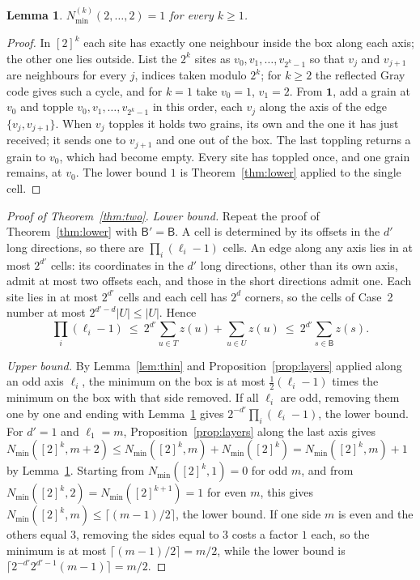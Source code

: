 \documentclass[11pt]{amsart}
\newtheorem{lemma}[theorem]{Lemma}
\theoremstyle{definition}
\newcommand{\one}{\mathbf 1}
\newcommand{\Nmin}{N_{\min}}
\newcommand{\B}{\mathsf B}
\begin{document}
\begin{lemma}\label{lem:cube}
$\Nmin^{(k)}(2,\dots,2)=1$ for every $k\ge1$.
\end{lemma}

\begin{proof}
In $[2]^k$ each site has exactly one neighbour inside the box along each axis; the other one lies outside. List the $2^k$ sites as $v_0,v_1,\dots,v_{2^k-1}$ so that $v_j$ and $v_{j+1}$ are neighbours for every $j$, indices taken modulo $2^k$; for $k\ge2$ the reflected Gray code gives such a cycle, and for $k=1$ take $v_0=1$, $v_1=2$. From $\one$, add a grain at $v_0$ and topple $v_0,v_1,\dots,v_{2^k-1}$ in this order, each $v_j$ along the axis of the edge $\{v_j,v_{j+1}\}$. When $v_j$ topples it holds two grains, its own and the one it has just received; it sends one to $v_{j+1}$ and one out of the box. The last toppling returns a grain to $v_0$, which had become empty. Every site has toppled once, and one grain remains, at $v_0$. The lower bound $1$ is Theorem~\ref{thm:lower} applied to the single cell.
\end{proof}

\begin{proof}[Proof of Theorem~\ref{thm:two}]
\emph{Lower bound.} Repeat the proof of Theorem~\ref{thm:lower} with $\B'=\B$. A cell is determined by its offsets in the $d'$ long directions, so there are $\prod_i(\ell_i-1)$ cells. An edge along any axis lies in at most $2^{d'}$ cells: its coordinates in the $d'$ long directions, other than its own axis, admit at most two offsets each, and those in the short directions admit one. Each site lies in at most $2^{d'}$ cells and each cell has $2^d$ corners, so the cells of Case~2 number at most $2^{d'-d}|U|\le|U|$. Hence
\[
\prod_i(\ell_i-1)\ \le\ 2^{d'}\sum_{u\in T}z(u)+\sum_{u\in U}z(u)\ \le\ 2^{d'}\sum_{s\in\B}z(s).
\]

\emph{Upper bound.} By Lemma~\ref{lem:thin} and Proposition~\ref{prop:layers} applied along an odd axis $\ell_i$, the minimum on the box is at most $\tfrac12(\ell_i-1)$ times the minimum on the box with that side removed. If all $\ell_i$ are odd, removing them one by one and ending with Lemma~\ref{lem:cube} gives $2^{-d'}\prod_i(\ell_i-1)$, the lower bound. For $d'=1$ and $\ell_1=m$, Proposition~\ref{prop:layers} along the last axis gives $\Nmin([2]^k,m+2)\le\Nmin([2]^k,m)+\Nmin([2]^k)=\Nmin([2]^k,m)+1$ by Lemma~\ref{lem:cube}. Starting from $\Nmin([2]^k,1)=0$ for odd $m$, and from $\Nmin([2]^k,2)=\Nmin([2]^{k+1})=1$ for even $m$, this gives $\Nmin([2]^k,m)\le\lceil(m-1)/2\rceil$, the lower bound. If one side $m$ is even and the others equal $3$, removing the sides equal to $3$ costs a factor $1$ each, so the minimum is at most $\lceil(m-1)/2\rceil=m/2$, while the lower bound is $\lceil 2^{-d'}2^{d'-1}(m-1)\rceil=m/2$.
\end{proof}
\end{document}
